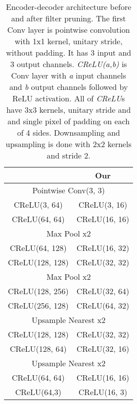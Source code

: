 \documentclass[../Main.tex]{subfiles}
\begin{document}
    \begin{table}
    \begin{center}
        \begin{tabular}{|c|c|}
        \hline
         \cite{Li2018} & Our \\
        \hline
          \multicolumn{2}{|c|}{Pointwise Conv(3, 3)} \\
          \hline
          CReLU(3, 64)  & CReLU(3, 16)  \\
          \hline
          CReLU(64, 64) & CReLU(16, 16)  \\
          \hline
          \multicolumn{2}{|c|}{Max Pool x2}      \\
          \hline
          CReLU(64, 128)  & CReLU(16, 32) \\
          \hline
          CReLU(128, 128)  & CReLU(32, 32)\\
          \hline
          \multicolumn{2}{|c|}{Max Pool x2}    \\
          \hline
          CReLU(128, 256) & CReLU(32, 64)\\
          \hline
          CReLU(256, 128) & CReLU(64, 32)\\
          \hline
          \multicolumn{2}{|c|}{Upsample Nearest x2}\\
          \hline
          CReLU(128, 128) & CReLU(32, 32)\\
          \hline
          CReLU(128, 64) & CReLU(32, 16)\\
          \hline
          \multicolumn{2}{|c|}{Upsample Nearest x2}\\
          \hline
          CReLU(64, 64) & CReLU(16, 16) \\
          \hline
          CReLU(64,3) & CReLU(16, 3)\\
          \hline
        \end{tabular}
            \end{center}
        \caption{Encoder-decoder architecture before and after filter pruning.
        The first Conv layer is pointwise convolution with 1x1 kernel, 
        unitary stride, without padding. It has 3 input and 3 output channels.
        \textit{CReLU(a,b)} is Conv layer with \textit{a} input channels and 
        \textit{b} output channels followed by ReLU activation. All of 
        \textit{CReLU}s have 3x3 kernels, unitary stride and and single pixel
        of padding on each of 4 sides. Downsampling and upsampling
        is done with 2x2 kernels and stride 2.
        }
        \label{table:vgg}
    \end{table}
    
\end{document}
